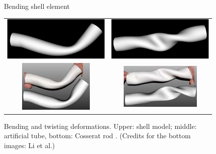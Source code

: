 \begin{figure}[tbh]
  \begin{minipage}[b]{0.3\linewidth}
      \framebox[1cm]{\rule{0pt}{1cm}}
      \caption{Bending shell element}
      \label{fig-shell}
  \end{minipage}
  \hspace{0.1\columnwidth}
  \begin{minipage}[b]{0.6\linewidth}
    \centering
    \begin{tabular}{cc}
     \includegraphics[width=0.5\columnwidth]{img/compare-bend.png}
      &
      \includegraphics[width=0.5\columnwidth]{img/compare-twist.png}
      \\
      \includegraphics[width=0.5\columnwidth]{img/compare-bend-other.png}
      &
      \includegraphics[width=0.5\columnwidth]{img/compare-twist-other.png}
    \end{tabular}
    \caption{Bending and twisting deformations. Upper: shell model; middle:
    artificial tube, bottom: Cosserat rod \cite{Li2009}. (Credits for the
    bottom images: Li et al.)}
    \label{fig-deformations}
  \end{minipage}
\end{figure}

